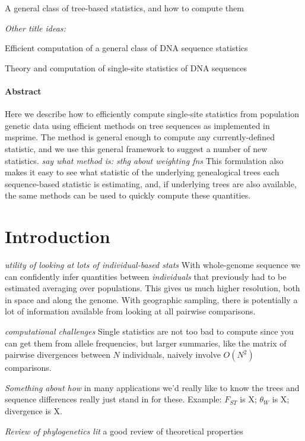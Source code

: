 \documentclass{article}
\newcommand{\plr}[1]{{\color{blue} \it #1}}
\begin{document}
\begin{center}
    A general class of tree-based statistics,
    and how to compute them
\end{center}

\emph{Other title ideas:}

Efficient computation of a general class of DNA sequence statistics

Theory and computation of single-site statistics of DNA sequences


\paragraph{Abstract}
Here we describe how to efficiently compute single-site statistics
from population genetic data
using efficient methods on tree sequences as implemented in msprime.
The method is general enough to compute any currently-defined statistic,
and we use this general framework to suggest a number of new statistics.
\plr{say what method is: sthg about weighting fns}
This formulation also makes it easy to see what statistic of the underlying genealogical trees
each sequence-based statistic is estimating,
and, if underlying trees are also available,
the same methods can be used to quickly compute these quantities.


\section*{Introduction}

\plr{utility of looking at lots of individual-based stats}
With whole-genome sequence
we can confidently infer quantities
between \emph{individuals} that previously had to be estimated
averaging over populations.
This gives us much higher resolution, both in space and along the genome.
With geographic sampling,
there is potentially a lot of information available
from looking at all pairwise comparisons.

\plr{computational challenges}
Single statistics are not too bad to compute
since you can get them from allele frequencies,
but larger summaries, like the matrix of pairwise divergences between $N$ individuals,
naively involve $O(N^2)$ comparisons.

\plr{Something about how} in many applications
we'd really like to know the trees
and sequence differences really just stand in for these.
Example: $F_{ST}$ is X; 
$\theta_W$ is X;
divergence is X.

\plr{Review of phylogenetics lit}
a good review of theoretical properties \citet{semple_and_steel}
\end{document}
